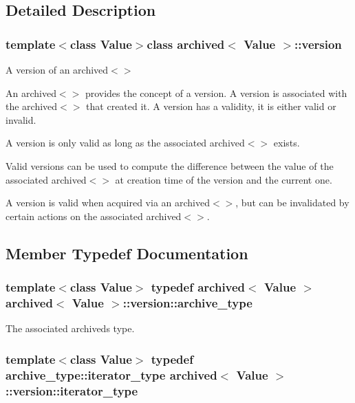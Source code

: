 \subsection{Detailed Description}
\subsubsection*{template$<$class Value$>$class archived$<$ Value $>$\+::version}

A version of an archived$<$$>$ 

An archived$<$$>$ provides the concept of a version. A version is associated with the archived$<$$>$ that created it. A version has a validity, it is either valid or invalid.

A version is only valid as long as the associated archived$<$$>$ exists.

Valid versions can be used to compute the difference between the value of the associated archived$<$$>$ at creation time of the version and the current one.

A version is valid when acquired via an archived$<$$>$, but can be invalidated by certain actions on the associated archived$<$$>$. 

\subsection{Member Typedef Documentation}
\hypertarget{classarchived_1_1version_a791c80c76addc75c5ee41f31ae41817a}{}
\subsubsection[{archive\+\_\+type}]{\setlength{\rightskip}{0pt plus 5cm}template$<$class Value$>$ typedef {\bf archived}$<$ Value $>$ {\bf archived}$<$ Value $>$\+::{\bf version\+::archive\+\_\+type}}\label{classarchived_1_1version_a791c80c76addc75c5ee41f31ae41817a}


The associated archived\textquotesingle{}s type. 

\hypertarget{classarchived_1_1version_acc56ba0e55a7f1856a459799d6d71aa9}{}
\subsubsection[{iterator\+\_\+type}]{\setlength{\rightskip}{0pt plus 5cm}template$<$class Value$>$ typedef {\bf archive\+\_\+type\+::iterator\+\_\+type} {\bf archived}$<$ Value $>$\+::{\bf version\+::iterator\+\_\+type}\hspace{0.3cm}{\ttfamily [private]}}\label{classarchived_1_1version_acc56ba0e55a7f1856a459799d6d71aa9}
\hypertarget{classarchived_1_1version_ae9028b053631ebb7832c9457cac4c29b}{}
